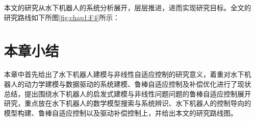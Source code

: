 


本文的研究从水下机器人的系统分析展开，层层推进，进而实现研究目标。全文的研究路线如下所图\ref{fig:chap1:F4}所示：







\section{本章小结 }

本章中首先给出了水下机器人建模与非线性自适应控制的研究意义，着重对水下机器人的动力学建模与数据驱动的系统建模、鲁棒自适应控制及补偿优化进行了现状总结，提出围绕水下机器人的启发式建模与非线性问题问题的鲁棒自适应控制展开研究，重点放在水下机器人的数学模型搜索与系统辨识、水下机器人的控制导向的模型构建、鲁棒自适应控制以及驱动补偿控制上，并给出本文的研究路线图。
